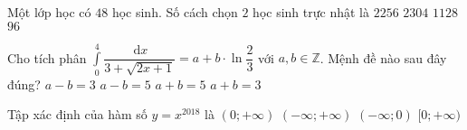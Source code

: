 \begin{ex}%
	Một lớp học có $ 48  $ học sinh. Số cách chọn $ 2 $ học sinh trực nhật là 
	\choice
	{$ 2256 $}
	{$ 2304 $}
	{\True $ 1128 $}
	{$ 96 $}
\end{ex}
\begin{ex}%
	Cho tích phân $ \displaystyle \int \limits^4_0 \dfrac{ \mathrm{\, d} x }{3 + \sqrt{2x + 1} } = a + b \cdot \ln \dfrac{2}{3}$ với $ a, b \in \mathbb{Z} $. Mệnh đề nào sau đây đúng?
	\choice
	{$ a - b = 3 $}
	{ $ a - b = 5 $}
	{\True$ a + b = 5 $}
	{$ a + b = 3 $}
\end{ex}
\begin{ex}%
	Tập xác định của hàm số $  y = x^{2018} $ là
	\choice
	{$ (0;+ \infty) $}
	{\True $ (-\infty; + \infty) $}
	{$ (-\infty; 0) $}
	{$ [0; + \infty) $}
\end{ex}
